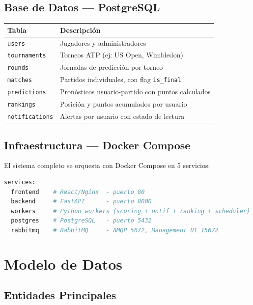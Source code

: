 \documentclass[12pt,a4paper]{article}
\newcommand{\code}[1]{\texttt{\small\color{navy}#1}}
\begin{document}
\subsection{Base de Datos — PostgreSQL}

\begin{tabularx}{\linewidth}{@{}lX@{}}
  \toprule
  \textbf{Tabla} & \textbf{Descripción} \\
  \midrule
  \code{users}         & Jugadores y administradores \\
  \code{tournaments}   & Torneos ATP (ej: US Open, Wimbledon) \\
  \code{rounds}        & Jornadas de predicción por torneo \\
  \code{matches}       & Partidos individuales, con flag \code{is\_final} \\
  \code{predictions}   & Pronósticos usuario-partido con puntos calculados \\
  \code{rankings}      & Posición y puntos acumulados por usuario \\
  \code{notifications} & Alertas por usuario con estado de lectura \\
  \bottomrule
\end{tabularx}

\subsection{Infraestructura — Docker Compose}

El sistema completo se orquesta con Docker Compose en 5 servicios:

\begin{lstlisting}[language=bash, caption=Servicios Docker Compose]
services:
  frontend    # React/Nginx  - puerto 80
  backend     # FastAPI      - puerto 8000
  workers     # Python workers (scoring + notif + ranking + scheduler)
  postgres    # PostgreSQL   - puerto 5432
  rabbitmq    # RabbitMQ     - AMQP 5672, Management UI 15672
\end{lstlisting}

\section{Modelo de Datos}

\subsection{Entidades Principales}
\end{document}
